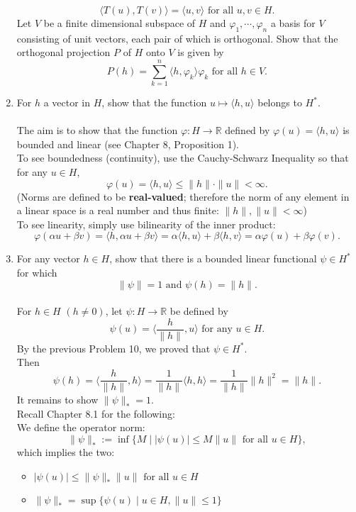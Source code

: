 \begin{enumerate}
    \[
        \langle T(u),T(v)\rangle=\langle u,v\rangle\text{ for all }u,v\in H.
    \]
    Let $V$ be a finite dimensional subspace of $H$ and $\varphi_1,\cdots,\varphi_n$ a basis for $V$ consisting of unit vectors, each pair of which is orthogonal. Show that the orthogonal projection $P$ of $H$ onto $V$ is given by 
    \[
        P(h)=\sum_{k=1}^n\langle h,\varphi_k\rangle\varphi_k\text{ for all }h\in V.
    \]
    \item For $h$ a vector in $H$, show that the function $u\mapsto\langle h,u\rangle$ belongs to $H^*$.\\
    \\The aim is to show that the function $\varphi:H\to\mathbb{R}$ defined by $\varphi(u)=\langle h,u\rangle$ is bounded and linear (see Chapter 8, Proposition 1).
    \\To see boundedness (continuity), use the Cauchy-Schwarz Inequality so that for any $u\in H$,
    \[
        \varphi(u)=\langle h,u\rangle\le\|h\|\cdot\|u\|<\infty.
    \]
    (Norms are defined to be \textbf{real-valued}; therefore the norm of any element in a linear space is a real number and thus finite: $\|h\|,\|u\|<\infty$)
    \\To see linearity, simply use bilinearity of the inner product:
    \[
        \varphi(\alpha u+\beta v)=\langle h,\alpha u+\beta v\rangle=\alpha\langle h,u\rangle+\beta\langle h,v\rangle=\alpha\varphi(u)+\beta\varphi(v).
    \]
    \item For any vector $h\in H$, show that there is a bounded linear functional $\psi\in H^*$ for which 
    \[
        \|\psi\|=1\text{ and }\psi(h)=\|h\|.  
    \]
    \\For $h\in H$ $(h\neq0)$, let $\psi:H\to\mathbb{R}$ be defined by 
    \[
        \psi(u)=\langle \frac{h}{\|h\|},u\rangle\text{ for any }u\in H.
    \]
    By the previous Problem 10, we proved that $\psi\in H^*$.
    \\Then 
    \[
        \psi(h)=\langle \frac{h}{\|h\|},h\rangle=\frac{1}{\|h\|}\langle h,h\rangle=\frac{1}{\|h\|}\|h\|^2=\|h\|.
    \]
    It remains to show $\|\psi\|_*=1$.
    \\Recall Chapter 8.1 for the following:
    \\We define the operator norm:
    \[
        \|\psi\|_*:=\inf\{M\mid|\psi(u)|\le M\|u\|\text{ for all }u\in H\},
    \]
    which implies the two: 
    \begin{itemize}
        \item $|\psi(u)|\le \|\psi\|_*\|u\|\text{ for all }u\in H$
        \item $\|\psi\|_*=\sup\{\psi(u)\mid u\in H, \|u\|\le1\}$

\end{itemize}
\end{enumerate}
